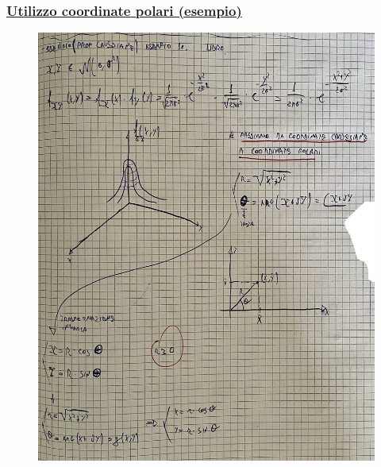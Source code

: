 \documentclass{article}
\begin{document}
\subsubsection{\underline{Utilizzo coordinate polari (esempio)}}
\begin{figure}[H]
\centering
\includegraphics[scale=0.16]{images/82.jpeg}
\end{figure} 
\end{document}
